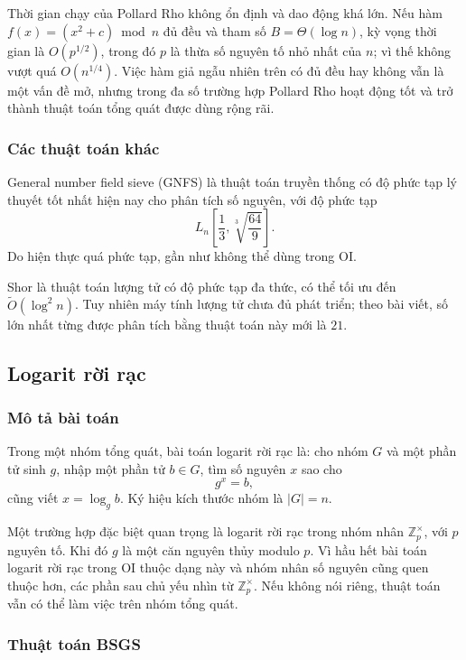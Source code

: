 \documentclass[11pt]{article}
\begin{document}
Thời gian chạy của Pollard Rho không ổn định và dao động khá lớn. Nếu hàm
\(f(x)=(x^2+c)\bmod n\) đủ đều và tham số \(B=\Theta(\log n)\), kỳ vọng thời
gian là \(O(p^{1/2})\), trong đó \(p\) là thừa số nguyên tố nhỏ nhất của \(n\);
vì thế không vượt quá \(O(n^{1/4})\). Việc hàm giả ngẫu nhiên trên có đủ đều
hay không vẫn là một vấn đề mở, nhưng trong đa số trường hợp Pollard Rho hoạt
động tốt và trở thành thuật toán tổng quát được dùng rộng rãi.

\subsubsection{Các thuật toán khác}

General number field sieve (GNFS) là thuật toán truyền thống có độ phức tạp lý
thuyết tốt nhất hiện nay cho phân tích số nguyên, với độ phức tạp
\[
  L_n\!\left[\frac13,\sqrt[3]{\frac{64}{9}}\right].
\]
Do hiện thực quá phức tạp, gần như không thể dùng trong OI.

Shor là thuật toán lượng tử có độ phức tạp đa thức, có thể tối ưu đến
\(\tilde O(\log^2 n)\). Tuy nhiên máy tính lượng tử chưa đủ phát triển; theo
bài viết, số lớn nhất từng được phân tích bằng thuật toán này mới là \(21\).

\subsection{Logarit rời rạc}

\subsubsection{Mô tả bài toán}

Trong một nhóm tổng quát, bài toán logarit rời rạc là: cho nhóm \(G\) và một
phần tử sinh \(g\), nhập một phần tử \(b\in G\), tìm số nguyên \(x\) sao cho
\[
  g^x=b,
\]
cũng viết \(x=\log_g b\). Ký hiệu kích thước nhóm là \(|G|=n\).

Một trường hợp đặc biệt quan trọng là logarit rời rạc trong nhóm nhân
\(\mathbb Z_p^\times\), với \(p\) nguyên tố. Khi đó \(g\) là một căn nguyên
thủy modulo \(p\). Vì hầu hết bài toán logarit rời rạc trong OI thuộc dạng này
và nhóm nhân số nguyên cũng quen thuộc hơn, các phần sau chủ yếu nhìn từ
\(\mathbb Z_p^\times\). Nếu không nói riêng, thuật toán vẫn có thể làm việc
trên nhóm tổng quát.

\subsubsection{Thuật toán BSGS}
\end{document}
